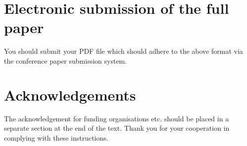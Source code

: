 \documentclass{article}\usepackage{graphicx, color}
\begin{document}
\section{Electronic submission of the full paper}
You should submit your {PDF} file which should adhere to
the above format via the conference paper submission
system.

\section*{Acknowledgements}
The acknowledgement for funding organisations etc.
should be placed in a separate section at the end of the
text. Thank you for your cooperation in complying with
these instructions.


\noindent

\end{document}
